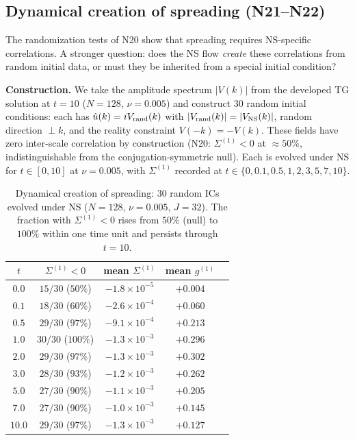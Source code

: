 \documentclass[11pt]{article}
\theoremstyle{definition}
\begin{document}
\subsection{Dynamical creation of spreading (N21--N22)}
\label{sec:creation}

The randomization tests of N20 show that spreading
requires NS-specific correlations.  A stronger
question: does the NS flow \emph{create} these
correlations from random initial data, or must
they be inherited from a special initial condition?

\medskip\noindent\textbf{Construction.}
We take the amplitude spectrum $|V(k)|$ from the
developed TG solution at $t=10$ ($N=128$,
$\nu=0.005$) and construct 30 random initial
conditions: each has $\hat u(k) = iV_{\rm rand}(k)$
with $|V_{\rm rand}(k)| = |V_{\rm NS}(k)|$,
random direction $\perp k$, and the reality
constraint $V(-k)=-V(k)$.  These fields have
zero inter-scale correlation by construction
(N20: $\Sigma^{(1)}<0$ at $\approx 50\%$,
indistinguishable from the conjugation-symmetric
null).
Each is evolved under NS for $t\in[0,10]$ at
$\nu=0.005$, with $\Sigma^{(1)}$ recorded at
$t\in\{0, 0.1, 0.5, 1, 2, 3, 5, 7, 10\}$.

\begin{table}[h]
\centering
\caption{Dynamical creation of spreading: 30 random
ICs evolved under NS ($N=128$, $\nu=0.005$, $J=32$).
The fraction with $\Sigma^{(1)}<0$ rises from
$50\%$ (null) to $100\%$ within one time unit
and persists through $t=10$.}
\label{tab:creation}
\begin{tabular}{@{}ccccc@{}}
\toprule
$t$ & $\Sigma^{(1)}<0$ & mean $\Sigma^{(1)}$
  & mean $g^{(1)}$ \\
\midrule
$0.0$ & $15/30$ ($50\%$)
  & $-1.8\times 10^{-5}$ & $+0.004$ \\
$0.1$ & $18/30$ ($60\%$)
  & $-2.6\times 10^{-4}$ & $+0.060$ \\
$0.5$ & $29/30$ ($97\%$)
  & $-9.1\times 10^{-4}$ & $+0.213$ \\
$1.0$ & $30/30$ ($100\%$)
  & $-1.3\times 10^{-3}$ & $+0.296$ \\
$2.0$ & $29/30$ ($97\%$)
  & $-1.3\times 10^{-3}$ & $+0.302$ \\
$3.0$ & $28/30$ ($93\%$)
  & $-1.2\times 10^{-3}$ & $+0.262$ \\
$5.0$ & $27/30$ ($90\%$)
  & $-1.1\times 10^{-3}$ & $+0.205$ \\
$7.0$ & $27/30$ ($90\%$)
  & $-1.0\times 10^{-3}$ & $+0.145$ \\
$10.0$ & $29/30$ ($97\%$)
  & $-1.3\times 10^{-3}$ & $+0.127$ \\
\bottomrule
\end{tabular}
\end{table}
\end{document}
